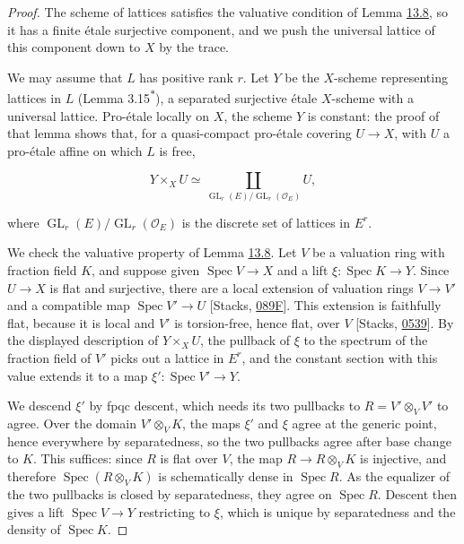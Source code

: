 \documentclass[11pt]{article}
\newcommand{\bpout}[1]{#1\textsuperscript{\hyperlink{bp-outside}{\ensuremath{\ast}}}}
\providecommand{\GL}{}\renewcommand{\GL}{\operatorname{GL}}
\begin{document}
\begin{proof}[{Proof}]\label{bp30}%
The scheme of lattices satisfies the valuative condition of Lemma \hyperref[bp26]{13.8}, so it has a finite étale surjective component, and we push the universal lattice of this component down to \(X\) by the trace.

We may assume that \(L\) has positive rank \(r\). Let \(Y\) be the \(X\)-scheme representing lattices in \(L\) (Lemma \bpout{3.15}), a separated surjective étale \(X\)-scheme with a universal lattice. Pro-étale locally on \(X\), the scheme \(Y\) is constant: the proof of that lemma shows that, for a quasi-compact pro-étale covering \(U\to X\), with \(U\) a pro-étale affine on which \(L\) is free,

\[
Y\times_XU\simeq
\coprod_{\GL_r(E)/\GL_r(\mathcal O_E)} U,
\]

where \(\GL_r(E)/\GL_r(\mathcal O_E)\) is the discrete set of lattices in \(E^r\).

We check the valuative property of Lemma \hyperref[bp26]{13.8}. Let \(V\) be a valuation ring with fraction field \(K\), and suppose given \(\operatorname{Spec}V\to X\) and a lift \(\xi:\operatorname{Spec}K\to Y\). Since \(U\to X\) is flat and surjective, there are a local extension of valuation rings \(V\to V'\) and a compatible map \(\operatorname{Spec}V'\to U\) [Stacks, \href{https://stacks.math.columbia.edu/tag/089F}{089F}]. This extension is faithfully flat, because it is local and \(V'\) is torsion-free, hence flat, over \(V\) [Stacks, \href{https://stacks.math.columbia.edu/tag/0539}{0539}]. By the displayed description of \(Y\times_XU\), the pullback of \(\xi\) to the spectrum of the fraction field of \(V'\) picks out a lattice in \(E^r\), and the constant section with this value extends it to a map \(\xi':\operatorname{Spec}V'\to Y\).

We descend \(\xi'\) by fpqc descent, which needs its two pullbacks to \(R=V'\otimes_VV'\) to agree. Over the domain \(V'\otimes_VK\), the maps \(\xi'\) and \(\xi\) agree at the generic point, hence everywhere by separatedness, so the two pullbacks agree after base change to \(K\). This suffices: since \(R\) is flat over \(V\), the map \(R\to R\otimes_VK\) is injective, and therefore \(\operatorname{Spec}(R\otimes_VK)\) is schematically dense in \(\operatorname{Spec}R\). As the equalizer of the two pullbacks is closed by separatedness, they agree on \(\operatorname{Spec}R\). Descent then gives a lift \(\operatorname{Spec}V\to Y\) restricting to \(\xi\), which is unique by separatedness and the density of \(\operatorname{Spec}K\).


\end{proof}
\end{document}
